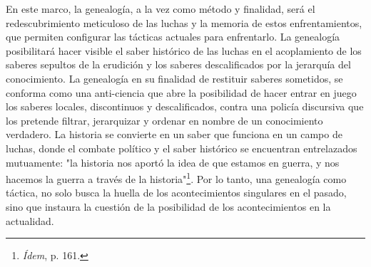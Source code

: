 \documentclass{book}
\begin{document}
En este marco, la genealogía, a la vez como método y finalidad, será el
redescubrimiento meticuloso de las luchas y la memoria de estos
enfrentamientos, que permiten configurar las tácticas actuales para
enfrentarlo. La genealogía posibilitará hacer visible el saber histórico
de las luchas en el acoplamiento de los saberes sepultos de la erudi­ción
y los saberes descalificados por la jerarquía del cono­cimiento. La
genealogía en su finalidad de restituir saberes sometidos, se conforma
como una anti-ciencia que abre la posibilidad de hacer entrar en juego
los saberes locales, discontinuos y descalificados, contra una policía
discursiva que los pretende filtrar, jerarquizar y ordenar en nombre de
un conocimiento verdadero. La historia se convierte en un saber que
funciona en un campo de luchas, donde el combate político y el saber
histórico se encuentran entrelazados mutuamente: "la historia nos aportó
la idea de que estamos en guerra, y nos hacemos la guerra a través de la
historia"\footnote{\emph{Ídem}, p. 161.}. Por lo tanto, una genealogía
como táctica, no solo busca la huella de los acontecimientos singulares
en el pasado, sino que instaura la cuestión de la posibilidad de los
acontecimientos en la actualidad.
\end{document}
